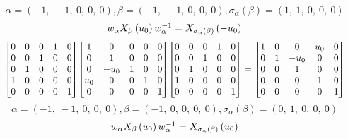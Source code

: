 \documentclass[11pt]{article}
\theoremstyle{definition}
\begin{document}
\providecommand{\scaletoalign}[2]{%
  \sbox0{$#2$}%
  \ifdim\wd0>#1\relax 
    \resizebox{#1}{!}{\usebox0}%
  \else 
    \usebox0%
  \fi 
}
\[
\alpha = \left( -1, \  -1, \  0, \  0, \  0\right), \beta = \left( -1, \  -1, \  0, \  0, \  0\right), \sigma_{\alpha}(\beta) = \left( 1, \  1, \  0, \  0, \  0\right)
\]
\[
\scaletoalign{\textwidth}{w_{\alpha} X_{\beta}\left(u_{0}\right) w_{\alpha}^{-1} = X_{\sigma_{\alpha}\left(\beta\right)}\left(- u_{0}\right)}
\]
\[
\scaletoalign{\textwidth}{{\left[\begin{matrix}0 & 0 & 0 & 1 & 0\\0 & 0 & 1 & 0 & 0\\0 & 1 & 0 & 0 & 0\\1 & 0 & 0 & 0 & 0\\0 & 0 & 0 & 0 & 1\end{matrix}\right]} {\left[\begin{matrix}1 & 0 & 0 & 0 & 0\\0 & 1 & 0 & 0 & 0\\0 & - u_{0} & 1 & 0 & 0\\u_{0} & 0 & 0 & 1 & 0\\0 & 0 & 0 & 0 & 1\end{matrix}\right]} {\left[\begin{matrix}0 & 0 & 0 & 1 & 0\\0 & 0 & 1 & 0 & 0\\0 & 1 & 0 & 0 & 0\\1 & 0 & 0 & 0 & 0\\0 & 0 & 0 & 0 & 1\end{matrix}\right]} = {\left[\begin{matrix}1 & 0 & 0 & u_{0} & 0\\0 & 1 & - u_{0} & 0 & 0\\0 & 0 & 1 & 0 & 0\\0 & 0 & 0 & 1 & 0\\0 & 0 & 0 & 0 & 1\end{matrix}\right]}}
\]
\[
\alpha = \left( -1, \  -1, \  0, \  0, \  0\right), \beta = \left( -1, \  0, \  0, \  0, \  0\right), \sigma_{\alpha}(\beta) = \left( 0, \  1, \  0, \  0, \  0\right)
\]
\[
\scaletoalign{\textwidth}{w_{\alpha} X_{\beta}\left(u_{0}\right) w_{\alpha}^{-1} = X_{\sigma_{\alpha}\left(\beta\right)}\left(u_{0}\right)}
\]
\end{document}
